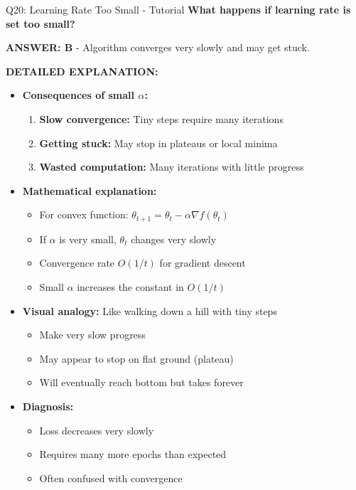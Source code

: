 \documentclass[8pt]{beamer}
\begin{document}
	\begin{frame}{Q20: Learning Rate Too Small - Tutorial}
		\fontsize{6.5}{7.5}\selectfont
		\textbf{What happens if learning rate is set too small?}
		
		\vspace{0.05cm}
		\textcolor{myblue}{\textbf{ANSWER: B}} - Algorithm converges very slowly and may get stuck.
		
		\vspace{0.05cm}
		\textbf{DETAILED EXPLANATION:}
		\begin{itemize}
			\item \textbf{Consequences of small $\alpha$:}
			\begin{enumerate}
				\item \textbf{Slow convergence:} Tiny steps require many iterations
				\item \textbf{Getting stuck:} May stop in plateaus or local minima
				\item \textbf{Wasted computation:} Many iterations with little progress
			\end{enumerate}
			\item \textbf{Mathematical explanation:}
			\begin{itemize}
				\item For convex function: $\theta_{t+1} = \theta_t - \alpha \nabla f(\theta_t)$
				\item If $\alpha$ is very small, $\theta_t$ changes very slowly
				\item Convergence rate $O(1/t)$ for gradient descent
				\item Small $\alpha$ increases the constant in $O(1/t)$
			\end{itemize}
			\item \textbf{Visual analogy:} Like walking down a hill with tiny steps
			\begin{itemize}
				\item Make very slow progress
				\item May appear to stop on flat ground (plateau)
				\item Will eventually reach bottom but takes forever
			\end{itemize}
			\item \textbf{Diagnosis:}
			\begin{itemize}
				\item Loss decreases very slowly
				\item Requires many more epochs than expected
				\item Often confused with convergence
			\end{itemize}
		\end{itemize}
		

\end{frame}
\end{document}
